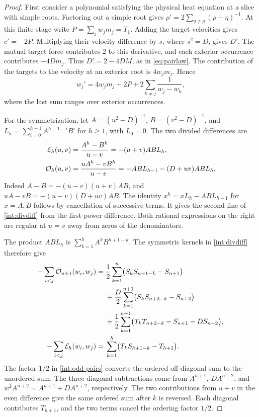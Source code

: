 \begin{proof}
First consider a polynomial satisfying the physical heat equation at
a slice with simple roots. Factoring out a simple root gives
\(\rho'=2\sum_{\eta\ne\rho}(\rho-\eta)^{-1}\). At this finite stage
write \(P=\sum_j w_jm_j=T_1\). Adding the target velocities gives
\(c'=-2P\). Multiplying their velocity difference by \(s\), where
\(s^2=D\), gives \(D'\). The mutual target force contributes \(2\)
to this derivative, and each exterior occurrence contributes
\(-4Dm_j\). Thus \(D'=2-4DM\), as in \eqref{eq:pairlaw}.
The contribution of the targets to the velocity at an exterior root
is \(4w_jm_j\). Hence
\begin{equation}
 w_j'=4w_jm_j+2P+2\sum_{k\ne j}\frac{1}{w_j-w_k},
 \label{int:relative}
\end{equation}
where the last sum ranges over exterior occurrences.

For the symmetrization, let \(A=(u^2-D)^{-1}\), \(B=(v^2-D)^{-1}\),
and \(L_h=\sum_{i=0}^{h-1}A^{h-1-i}B^i\) for \(h\geq1\), with
\(L_0=0\). The two divided differences are
\begin{align}
 \mathcal E_h(u,v)&=\frac{A^h-B^h}{u-v}=-(u+v)AB L_h, \notag\\
 \mathcal O_h(u,v)&=\frac{uA^h-vB^h}{u-v}
              =-AB L_{h-1}-(D+uv)AB L_h. \label{int:divdiff}
\end{align}
Indeed \(A-B=-(u-v)(u+v)AB\), and
\(uA-vB=-(u-v)(D+uv)AB\). The identity
\(x^h=xL_h-AB L_{h-1}\) for \(x=A,B\) follows by cancellation of
successive terms. It gives the second line of \eqref{int:divdiff}
from the first-power difference. Both rational expressions on the
right are regular at \(u=v\) away from zeros of the denominators.

The product \(AB L_h\) is \(\sum_{k=1}^h A^k B^{h+1-k}\).
The symmetric kernels in \eqref{int:divdiff} therefore give
\begin{align}
 -\sum_{i<j}\mathcal O_{n+1}(w_i,w_j)
  ={}&\frac12\sum_{k=1}^{n}
             \bigl(S_kS_{n+1-k}-S_{n+1}\bigr)\notag\\
   &+\frac D2\sum_{k=1}^{n+1}
             \bigl(S_kS_{n+2-k}-S_{n+2}\bigr)\notag\\
   &+\frac12\sum_{k=1}^{n+1}
             \bigl(T_kT_{n+2-k}-S_{n+1}-DS_{n+2}\bigr),
     \label{int:odd-pairs}\\
 -\sum_{i<j}\mathcal E_h(w_i,w_j)
  ={}&\sum_{k=1}^{h}\bigl(T_kS_{h+1-k}-T_{h+1}\bigr).
     \label{int:even-pairs}
\end{align}
The factor \(1/2\) in \eqref{int:odd-pairs} converts the ordered
off-diagonal sum to the unordered sum. The three diagonal subtractions
come from \(A^{n+1}\), \(DA^{n+2}\), and
\(w^2 A^{n+2}=A^{n+1}+DA^{n+2}\), respectively.
The two contributions from \(u+v\) in the even difference give the
same ordered sum after \(k\) is reversed. Each diagonal contributes
\(T_{h+1}\), and the two terms cancel the ordering factor \(1/2\).


\end{proof}
